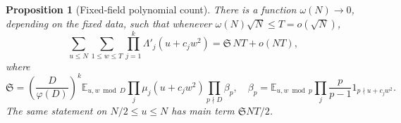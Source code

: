 \documentclass[11pt]{article}
\newtheorem{proposition}[theorem]{Proposition}
\theoremstyle{definition}
\theoremstyle{remark}
\begin{document}
\begin{proposition}[Fixed-field polynomial count]\label{prop:v5-artin-patterns}
There is a function $\omega(N)\to0$, depending on the fixed data, such that
whenever $\omega(N)\sqrt N\leq T=o(\sqrt N)$,
\begin{equation}\label{eq:v5-artin-patterns}
 \sum_{u\leq N}\sum_{1\leq w\leq T}
       \prod_{j=1}^k\Lambda'_j(u+c_jw^2)
       =\mathfrak S\,NT+o(NT),
\end{equation}
where
\begin{equation}\label{eq:v5-artin-series}
 \mathfrak S=
 \left(\frac D{\varphi(D)}\right)^k
 \mathbb E_{u,w\bmod D}\prod_j\mu_j(u+c_jw^2)
 \prod_{p\nmid D}\beta_p,
 \quad
 \beta_p=\mathbb E_{u,w\bmod p}
       \prod_j\frac p{p-1}1_{p\nmid u+c_jw^2}.
\end{equation}
The same statement on $N/2\leq u\leq N$ has main term
$\mathfrak SNT/2$.
\end{proposition}
\end{document}
